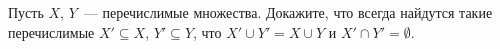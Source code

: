 Пусть $X$, $Y$~--- перечислимые множества. Докажите, что всегда найдутся такие перечислимые $X' \subseteq X$, $Y' \subseteq
Y$, что $X' \cup Y' = X \cup Y$ и $X' \cap Y' = \emptyset$.